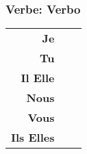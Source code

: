 \documentclass{subfiles}
\begin{document}
\begin{multicols}{3}
        \subsubsection{Verbe: Verbo}
            \begin{tabular}{r l r}
                \textbf{Je}        &  &\\
                \textbf{Tu}        &  &\\
                \textbf{Il Elle}   &  &\\
                \textbf{Nous}      &  &\\
                \textbf{Vous}      &  &\\
                \textbf{Ils Elles} &  &
            \end{tabular}
    \end{multicols}
    \newpage  
\end{document}
